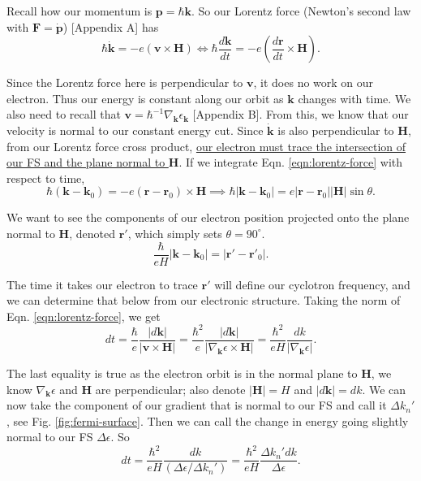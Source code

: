 \documentclass[12pt]{revtex4-2}
\begin{document}
Recall how our momentum is $\mathbf{p} = \hbar\mathbf{k}$.  So our Lorentz force (Newton's second law with $\mathbf{F} = \dot{\mathbf{p}}$) [Appendix A] has
\begin{equation}\label{eqn:lorentz-force}
    \hbar\dot{\mathbf{k}} = -e (\mathbf{v} \times \mathbf{H}) \iff \hbar\frac{d\mathbf{k}}{dt} = -e\left( \frac{d\mathbf{r}}{dt} \times \mathbf{H} \right).
\end{equation}

Since the Lorentz force here is perpendicular to $\mathbf{v}$, it does no work on our electron.  Thus our energy is constant along our orbit as $\mathbf{k}$ changes with time.  We also need to recall that $\mathbf{v} = \hbar^{-1}\nabla_\mathbf{k}\epsilon_\mathbf{k}$ [Appendix B].  From this, we know that our velocity is normal to our constant energy cut.  Since $\dot{\mathbf{k}}$ is also perpendicular to $\mathbf{H}$, from our Lorentz force cross product, \underline{our electron must trace the intersection of our FS and the plane normal to $\mathbf{H}$}.  If we integrate Eqn. \ref{eqn:lorentz-force} with respect to time, 
\begin{equation}
    \hbar(\mathbf{k} - \mathbf{k}_0) = -e(\mathbf{r} - \mathbf{r}_0)\times\mathbf{H} \implies \hbar|\mathbf{k} - \mathbf{k}_0| = e|\mathbf{r} - \mathbf{r}_0||\mathbf{H}|\sin\theta.
\end{equation}

We want to see the components of our electron position projected onto the plane normal to $\mathbf{H}$, denoted $\mathbf{r}'$, which simply sets $\theta = 90^\circ$.
\begin{equation}
    \frac{\hbar}{eH}|\mathbf{k} - \mathbf{k}_0| = |\mathbf{r}' - \mathbf{r}'_0|.
\end{equation}

The time it takes our electron to trace $\mathbf{r}'$ will define our cyclotron frequency, and we can determine that below from our electronic structure. Taking the norm of Eqn. \ref{eqn:lorentz-force}, we get 
\begin{equation}
    dt = \frac{\hbar}{e} \frac{|d\mathbf{k}|}{|\mathbf{v}\times\mathbf{H}|} = \frac{\hbar^2}{e} \frac{|d\mathbf{k}|}{|\nabla_\mathbf{k}\epsilon \times \mathbf{H}|} = \frac{\hbar^2}{eH} \frac{dk}{|\nabla_\mathbf{k}\epsilon|}.
\end{equation}

The last equality is true as the electron orbit is in the normal plane to $\mathbf{H}$, we know $\nabla_\mathbf{k}\epsilon$ and $\mathbf{H}$ are perpendicular; also denote $|\mathbf{H}| = H$ and $|d\mathbf{k}| = dk$.  We can now take the component of our gradient that is normal to our FS and call it $\Delta k_n'$, see Fig. \ref{fig:fermi-surface}.  Then we can call the change in energy going slightly normal to our FS $\Delta \epsilon$.  So 
\begin{equation}
    dt = \frac{\hbar^2}{eH} \frac{dk}{(\Delta \epsilon / \Delta k_n')} = \frac{\hbar^2}{eH} \frac{\Delta k_n' dk}{\Delta \epsilon}.
\end{equation}
\end{document}
